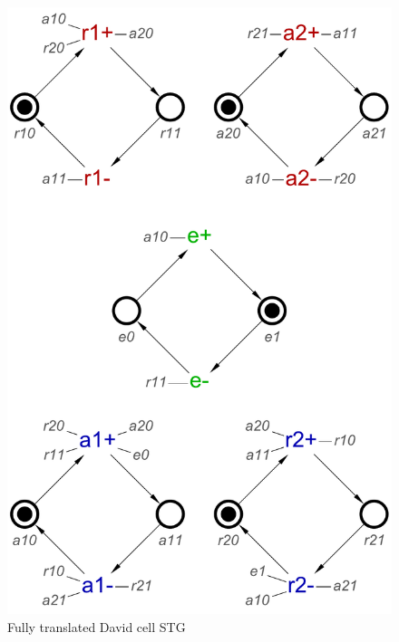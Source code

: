 \documentclass[british,conference,compsoc]{IEEEtran}
\begin{document}
\begin{figure}[h]
\vspace{-4mm}
\begin{centering}
\includegraphics[scale=0.3]{Images/dc-translated-stg}
\par\end{centering}
\protect\caption{\label{fig:dc-stg-translated} Fully translated David cell STG}
\vspace{-5mm}
\end{figure}
\end{document}
